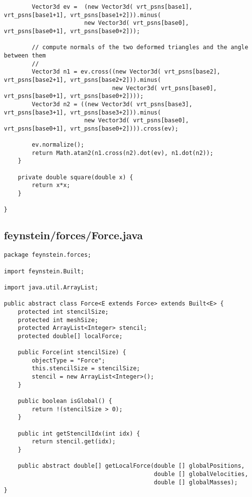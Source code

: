 \begin{lstlisting}
		Vector3d ev =  (new Vector3d( vrt_psns[base1], vrt_psns[base1+1], vrt_psns[base1+2])).minus(
					   new Vector3d( vrt_psns[base0], vrt_psns[base0+1], vrt_psns[base0+2]));
		
		// compute normals of the two deformed triangles and the angle between them
		//
		Vector3d n1 = ev.cross((new Vector3d( vrt_psns[base2], vrt_psns[base2+1], vrt_psns[base2+2])).minus(
							   new Vector3d( vrt_psns[base0], vrt_psns[base0+1], vrt_psns[base0+2])));
		Vector3d n2 = ((new Vector3d( vrt_psns[base3], vrt_psns[base3+1], vrt_psns[base3+2])).minus(
					   new Vector3d( vrt_psns[base0], vrt_psns[base0+1], vrt_psns[base0+2]))).cross(ev);
		
		ev.normalize();
		return Math.atan2(n1.cross(n2).dot(ev), n1.dot(n2));
	}
	
	private double square(double x) {
		return x*x;
	}
	
}
\end{lstlisting}

\subsection*{feynstein/forces/Force.java}
\begin{lstlisting}
package feynstein.forces;

import feynstein.Built;

import java.util.ArrayList;

public abstract class Force<E extends Force> extends Built<E> {
	protected int stencilSize;
	protected int meshSize;
	protected ArrayList<Integer> stencil;
	protected double[] localForce;
	
    public Force(int stencilSize) {
		objectType = "Force";
		this.stencilSize = stencilSize;
		stencil = new ArrayList<Integer>();
	}
	
	public boolean isGlobal() {
		return !(stencilSize > 0); 
	}
	
	public int getStencilIdx(int idx) {
		return stencil.get(idx);
	}
	
	public abstract double[] getLocalForce(double [] globalPositions,
										   double [] globalVelocities,
										   double [] globalMasses);
}\end{lstlisting}

